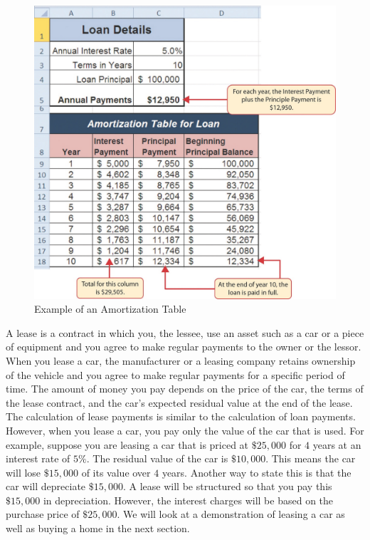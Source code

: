 \begin{figure}[H]
	\centering
	\includegraphics[width=\maxwidth{.95\linewidth}]{gfx/ch02_fig29}
	\caption{Example of an Amortization Table}
	\label{02:fig29}
\end{figure}

A lease is a contract in which you, the lessee, use an asset such as a car or a piece of equipment and you agree to make regular payments to the owner or the lessor. When you lease a car, the manufacturer or a leasing company retains ownership of the vehicle and you agree to make regular payments for a specific period of time. The amount of money you pay depends on the price of the car, the terms of the lease contract, and the car's expected residual value at the end of the lease. The calculation of lease payments is similar to the calculation of loan payments. However, when you lease a car, you pay only the value of the car that is used. For example, suppose you are leasing a car that is priced at $ \$25,000 $ for $ 4 $ years at an interest rate of $ 5\% $. The residual value of the car is $ \$10,000 $. This means the car will lose $ \$15,000 $ of its value over $ 4 $ years. Another way to state this is that the car will depreciate $ \$15,000 $. A lease will be structured so that you pay this $ \$15,000 $ in depreciation. However, the interest charges will be based on the purchase price of $ \$25,000 $. We will look at a demonstration of leasing a car as well as buying a home in the next section.

